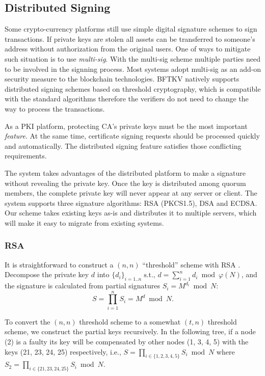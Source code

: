 \subsection{Distributed Signing}
Some crypto-currency platforms still use simple digital signature
schemes to sign transactions. If private keys are stolen all assets
can be transferred to someone's address without authorization from
the original users. One of ways to mitigate such situation is to
use {\em multi-sig}. With the multi-sig scheme multiple parties need
to be involved in the signning process. Most systems adopt multi-sig
as an add-on security measure to the blockchain technologies. BFTKV
natively supports distributed signing schemes based on threshold
cryptography, which is compatible with the standard algorithms
therefore the verifiers do not need to change the way to process the
transactions.

As a PKI platform, protecting CA's private keys must be the most
important {\em feature}. At the same time, certificate signing
requests should be processed quickly and automatically. The
distributed signing feature satisfies those conflicting requirements.

The system takes advantages of the distributed platform to make a
signature without revealing the private key. Once the key is
distributed among quorum members, the complete private key will never
appear at any server or client. The system supports three
signature algorithms: RSA (PKCS1.5), DSA and ECDSA. Our scheme takes
existing keys as-is and distributes it to multiple servers, which will
make it easy to migrate from existing systems.

\subsubsection*{RSA}
\label{thrsa}
It is straightforward to construct a $(n, n)$ ``threshold'' scheme with
RSA \cite{garay,rabin}. Decompose the private key $d$ into $\{d_i\}_{i =
1..n} \; \text{s.t., } d = \sum_{i=1}^{n} d_i \bmod \varphi(N)$, and the
signature is calculated from partial signatures $S_i = M^{d_i} \bmod
N$:
\[
  S = \prod_{i=1}^{n} S_i = M^d \bmod N.
\]

To convert the $(n, n)$ threshold scheme to a somewhat $(t, n)$
threshold scheme, we construct the partial keys recursively. In the
following tree, if a node (2) is a faulty its key will be compensated
by other nodes (1, 3, 4, 5) with the keys (21, 23, 24, 25)
respectively, i.e., $S = \prod_{i \in \{1,2,3,4,5\}} S_i \bmod N$
where $S_2 = \prod_{i \in \{21,23,24,25\}} S_i \bmod N$.

